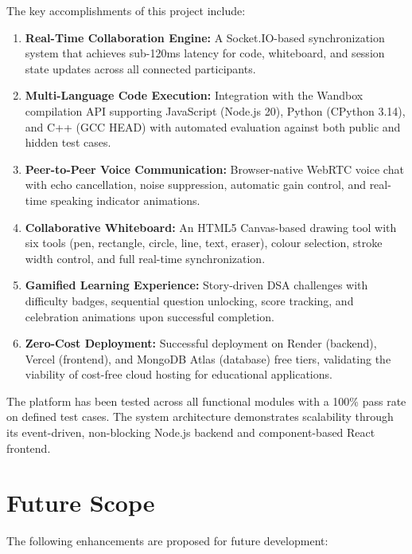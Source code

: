 \documentclass[12pt,a4paper,oneside]{report}
\begin{document}
The key accomplishments of this project include:

\begin{enumerate}[label=\arabic*.]
    \item \textbf{Real-Time Collaboration Engine:} A Socket.IO-based synchronization system that achieves sub-120ms latency for code, whiteboard, and session state updates across all connected participants.
    \item \textbf{Multi-Language Code Execution:} Integration with the Wandbox compilation API supporting JavaScript (Node.js 20), Python (CPython 3.14), and C++ (GCC HEAD) with automated evaluation against both public and hidden test cases.
    \item \textbf{Peer-to-Peer Voice Communication:} Browser-native WebRTC voice chat with echo cancellation, noise suppression, automatic gain control, and real-time speaking indicator animations.
    \item \textbf{Collaborative Whiteboard:} An HTML5 Canvas-based drawing tool with six tools (pen, rectangle, circle, line, text, eraser), colour selection, stroke width control, and full real-time synchronization.
    \item \textbf{Gamified Learning Experience:} Story-driven DSA challenges with difficulty badges, sequential question unlocking, score tracking, and celebration animations upon successful completion.
    \item \textbf{Zero-Cost Deployment:} Successful deployment on Render (backend), Vercel (frontend), and MongoDB Atlas (database) free tiers, validating the viability of cost-free cloud hosting for educational applications.
\end{enumerate}

The platform has been tested across all functional modules with a 100\% pass rate on defined test cases. The system architecture demonstrates scalability through its event-driven, non-blocking Node.js backend and component-based React frontend.

\section{Future Scope}

The following enhancements are proposed for future development:
\end{document}
